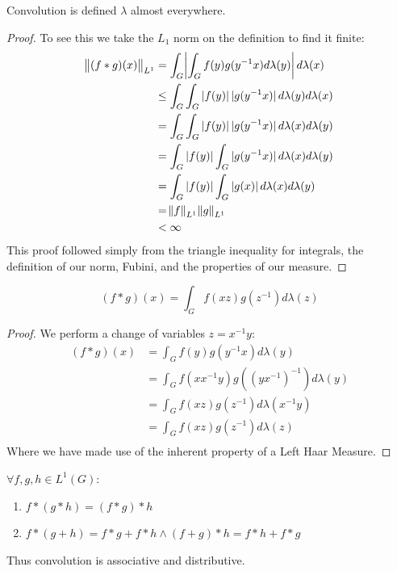 \begin{lemma}
Convolution is defined $\lambda$ almost everywhere. 
\end{lemma}

\begin{proof}To see this we take the $L_1$ norm on the definition to find it finite:
\begin{align*}
 \norm{(f \ast g)(x)}_{L^1} &= \int_G \abs{ \int_G f(y) g(y^{-1}x) d\lambda(y) } d\lambda(x) 
\\ 
&\leq \int_G \int_G \abs[0]{f(y)} \abs[0]{g(y^{-1}x)} d\lambda(y) d\lambda(x) \\
&=  \int_G \int_G \abs[0]{f(y)} \abs[0]{g(y^{-1}x)} d\lambda(x) d\lambda(y) \\
&=  \int_G \abs[0]{f(y)} \int_G  \abs[0]{g(y^{-1}x)} d\lambda(x) d\lambda(y) \\
&=  \int_G \abs[0]{f(y)} \int_G  \abs[0]{g(x)} d\lambda(x) d\lambda(y) \\
 &= \norm{f}_{L^1} \norm{g}_{L^1} \\
 &< \infty
\end{align*}
This proof followed simply from the triangle inequality for integrals, the definition of our norm, Fubini, and the properties of our measure.
\end{proof}

\begin{lemma}
\begin{equation*}
(f \ast g)(x) = \int_G f(xz)g(z^{-1}) d\lambda(z)
\end{equation*}
\end{lemma}

\begin{proof}
We perform a change of variables $z = x^{-1}y$:
\begin{align*}
(f \ast g)(x) &= \int_G f(y)g(y^{-1}x) d\lambda(y) \\
&= \int_G f(xx^{-1}y)g((yx^{-1})^{-1}) d\lambda(y) \\
&= \int_G f(xz)g(z^{-1}) d\lambda(x^{-1}y) \\
&= \int_G f(xz)g(z^{-1}) d\lambda(z) \\
\end{align*}
Where we have made use of the inherent property of a Left Haar Measure.
\end{proof}

\begin{proposition}

$\forall f,g,h \in L^1(G):$
\begin{enumerate}
\item
$f \ast (g \ast h) = (f \ast g) \ast h $
\item
$f \ast (g + h) = f \ast g + f \ast h \wedge (f+g) \ast h = f\ast h + f\ast g $
\end{enumerate}
Thus convolution is associative and distributive.
\end{proposition}

